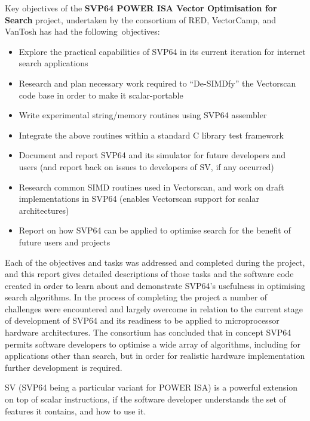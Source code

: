 Key objectives of the
\textbf{\acrshort{SVP64} \acrshort{POWER} \acrshort{ISA} Vector Optimisation for Search}
project, undertaken by the consortium of RED, VectorCamp, and VanTosh
has had the following objectives:

\begin{itemize}
  \item Explore the practical capabilities of \acrshort{SVP64} in its current
        iteration for internet search applications
  \item Research and plan necessary work required to “De-SIMDfy” the Vectorscan
        code base in order to make it scalar-portable
  \item Write experimental string/memory routines using \acrshort{SVP64}
        assembler
  \item Integrate the above routines within a standard C library test framework
  \item Document and report \acrshort{SVP64} and its simulator for future
        developers and users (and report back on issues to developers of
        \acrshort{SV}, if any occurred)
  \item Research common \acrshort{SIMD} routines used in Vectorscan, and work
        on draft implementations in \acrshort{SVP64}
        (enables Vectorscan support for scalar architectures)
  \item Report on how \acrshort{SVP64} can be applied to optimise search for
        the benefit of future users and projects
\end{itemize}

Each of the objectives and tasks was addressed and completed during the
project, and this report gives detailed descriptions of those tasks and the
software code created in order to learn about and demonstrate \acrshort{SVP64}’s
usefulness in optimising search algorithms.
In the process of completing the project a number of challenges were
encountered and largely overcome in relation to the current stage of
development of \acrshort{SVP64} and its readiness to be applied to microprocessor
hardware architectures.
The consortium has concluded that in concept \acrshort{SVP64} permits software developers
to optimise a wide array of algorithms, including for applications other
than search, but in order for realistic hardware implementation
further development is required.

\acrfull{SV} (\acrshort{SVP64} being a particular variant for \acrshort{POWER}
ISA) is a powerful extension on top of scalar instructions, if the software
developer understands the set of features it contains, and how to use it.

